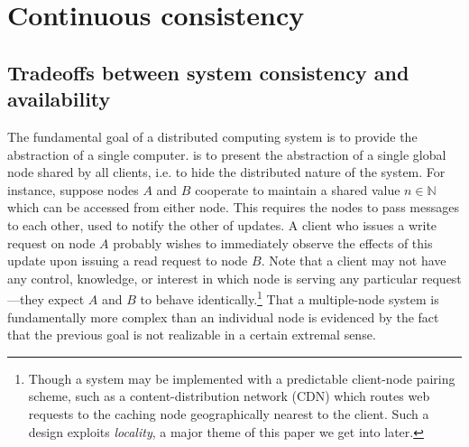\section{Continuous consistency}

\subsection{Tradeoffs between system consistency and availability}

The fundamental goal of a distributed computing system is to provide the abstraction of a single computer.
is to present the abstraction of a
single global node shared by all clients, i.e. to hide the distributed nature of
the system. For instance, suppose nodes $A$ and $B$ cooperate to maintain a
shared value $n \in \mathbb{N}$ which can be accessed from either node. This
requires the nodes to pass messages to each other, used to notify the other of
updates. A client who issues a write request on node $A$ probably wishes to
immediately observe the effects of this update upon issuing a read request to
node $B$. Note that a client may not have any control, knowledge, or interest in
which node is serving any particular request---they expect $A$ and $B$ to behave
identically.\footnote{Though a system may be implemented with a predictable
	client-node pairing scheme, such as a content-distribution network (CDN) which
	routes web requests to the caching node geographically nearest to the client.
	Such a design exploits \emph{locality}, a major theme of this paper we get into
	later.} That a multiple-node system is fundamentally more complex than an
individual node is evidenced by the fact that the previous goal is not
realizable in a certain extremal sense.

